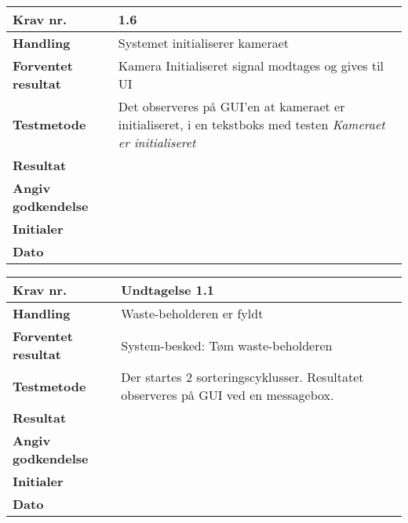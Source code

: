 	\begin{center}
		\begin{longtable}{ | m{4cm}| m{8.5cm}|} 
			\hline
			\textbf{Krav nr.} & 1.6    \\ 
			\hline
			\textbf{Handling} &  Systemet initialiserer kameraet  \\
			\hline
			\textbf{Forventet resultat} &  Kamera Initialiseret signal modtages og gives til UI  \\
			\hline
			\textbf{Testmetode}  & Det observeres på GUI’en at kameraet er initialiseret, i en tekstboks med testen \textit{Kameraet er initialiseret}   \\
			\hline
			\textbf{Resultat}  &    \\
			\hline
			\textbf{Angiv godkendelse} &     \\
			\hline
			\textbf{Initialer} &     \\
			\hline
			\textbf{Dato} &    \\
			\hline
		\end{longtable}
	\end{center}

\newpage		
		
	\begin{center}
		\begin{longtable}{ | m{4cm}| m{8.5cm}|} 
			\hline
			\textbf{Krav nr.} & Undtagelse 1.1   \\ 
			\hline
			\textbf{Handling} & Waste-beholderen er fyldt  \\
			\hline
			\textbf{Forventet resultat} & System-besked: Tøm waste-beholderen  \\
			\hline
			\textbf{Testmetode}  & Der startes 2 sorteringscyklusser. Resultatet observeres på GUI ved en messagebox.   \\
			\hline
			\textbf{Resultat}  &    \\
			\hline
			\textbf{Angiv godkendelse} &     \\
			\hline
			\textbf{Initialer} &     \\
			\hline
			\textbf{Dato} &    \\
			\hline
		\end{longtable}
	\end{center}
	
